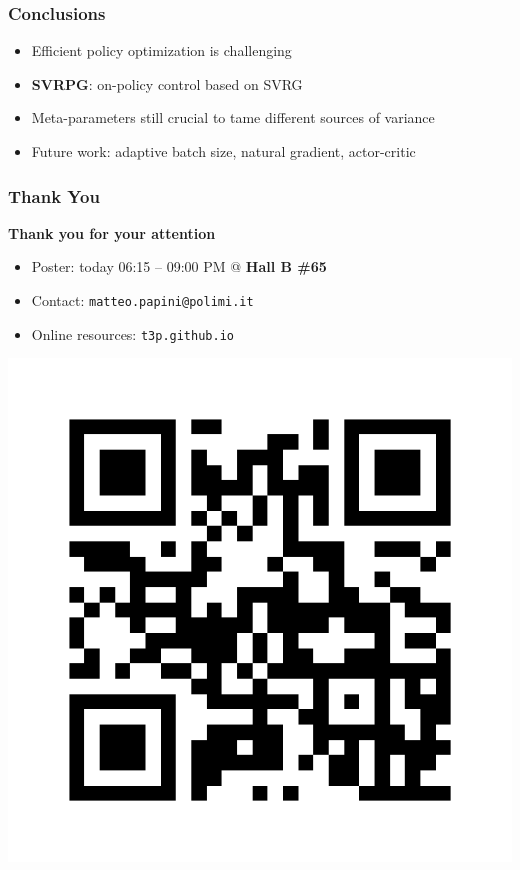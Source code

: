 \documentclass[aspectratio=169]{beamer}
\newcommand{\enb}[1]{\textcolor{poliblue1}{\textbf{#1}}}
\begin{document}
\begin{frame} 
\frametitle{Conclusions} 

\begin{itemize}
	\item Efficient policy optimization is challenging
	\item \enb{SVRPG}: on-policy control based on SVRG
	\item Meta-parameters still crucial to tame different sources of variance
	\item Future work: adaptive batch size, natural gradient, actor-critic
\end{itemize}

\end{frame}


\begin{frame} 
\frametitle{Thank You} 
\begin{center}
	\Large{\enb{Thank you for your attention}}
\end{center}

\begin{minipage}[]{.6\paperwidth}
\begin{itemize}
	\item Poster: today 06:15 -- 09:00 PM @ \enb{Hall B \#65} 
	\item Contact: \texttt{matteo.papini@polimi.it}
	\item Online resources: \texttt{t3p.github.io}
	\end{itemize}
\end{minipage}
\hfill%
\begin{minipage}[]{.2\paperwidth}
\includegraphics[width=.2\paperwidth]{../qrcode.pdf}
\end{minipage}

\end{frame}
\end{document}
